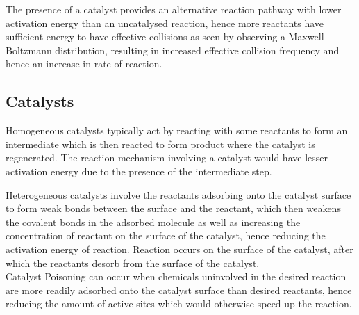\documentclass[../main]{subfiles}
\begin{document}
	The presence of a catalyst provides an alternative reaction pathway with lower activation energy than an uncatalysed reaction, hence more reactants have sufficient energy to have effective collisions as seen by observing a Maxwell-Boltzmann distribution, resulting in increased effective collision frequency and hence an increase in rate of reaction.

	\subsection{Catalysts}





	Homogeneous catalysts typically act by reacting with some reactants to form an intermediate which is then reacted to form product where the catalyst is regenerated. The reaction mechanism involving a catalyst would have lesser activation energy due to the presence of the intermediate step.


	Heterogeneous catalysts involve the reactants adsorbing onto the catalyst surface to form weak bonds between the surface and the reactant, which then weakens the covalent bonds in the adsorbed molecule as well as increasing the concentration of reactant on the surface of the catalyst, hence reducing the activation energy of reaction. Reaction occurs on the surface of the catalyst, after which the reactants desorb from the surface of the catalyst. \\

	Catalyst Poisoning can occur when chemicals uninvolved in the desired reaction are more readily adsorbed onto the catalyst surface than desired reactants, hence reducing the amount of active sites which would otherwise speed up the reaction.

\end{document}
